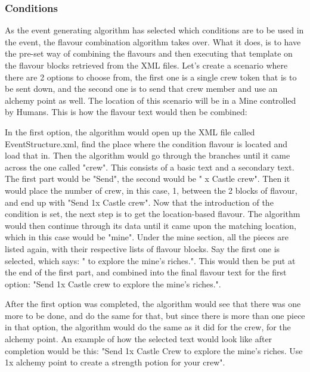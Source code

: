 \subsubsection{Conditions}
As the event generating algorithm has selected which conditions are to be used in the event, the flavour combination algorithm takes over. What it does, is to have the pre-set way of combining the flavours and then executing that template on the flavour blocks retrieved from the XML files. Let's create a scenario where there are 2 options to choose from, the first one is a single crew token that is to be sent down, and the second one is to send that crew member and use an alchemy point as well. The location of this scenario will be in a Mine controlled by Humans.
This is how the flavour text would then be combined:

In the first option, the algorithm would open up the XML file called EventStructure.xml, find the place where the condition flavour is located and load that in. Then the algorithm would go through the branches until it came across the one called "crew". This consists of a basic text and a secondary text. The first part would be "Send", the second would be " x Castle crew". Then it would place the number of crew, in this case, 1, between the 2 blocks of flavour, and end up with "Send 1x Castle crew".
Now that the introduction of the condition is set, the next step is to get the location-based flavour. The algorithm would then continue through its data until it came upon the matching location, which in this case would be "mine". Under the mine section, all the pieces are listed again, with their respective lists of flavour blocks. Say the first one is selected, which says: " to explore the mine's riches.". This would then be put at the end of the first part, and combined into the final flavour text for the first option: "Send 1x Castle crew to explore the mine's riches.".

After the first option was completed, the algorithm would see that there was one more to be done, and do the same for that, but since there is more than one piece in that option, the algorithm would do the same as it did for the crew, for the alchemy point.
An example of how the selected text would look like after completion would be this: "Send 1x Castle Crew to explore the mine's riches. Use 1x alchemy point to create a strength potion for your crew".

